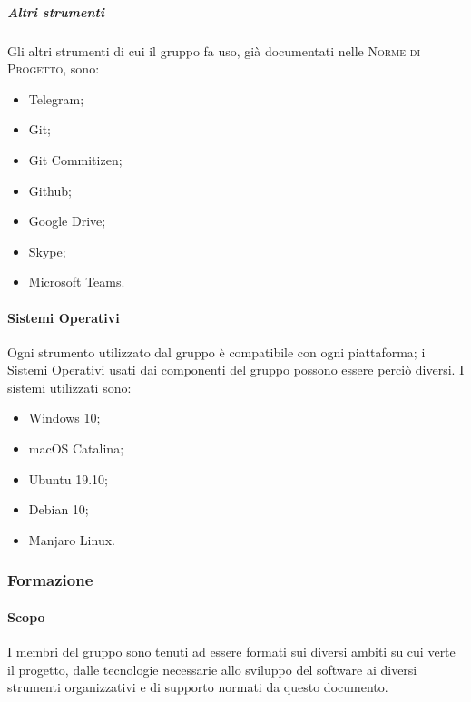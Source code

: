 \documentclass[../norme-di-progetto.tex]{subfiles}
\begin{document}
\subparagraph{Altri strumenti}
Gli altri strumenti di cui il gruppo fa uso, già documentati nelle \textsc{Norme di Progetto}, sono:
\begin{itemize}
  \item Telegram;
  \item Git;
  \item Git Commitizen;
  \item Github;
  \item Google Drive;
  \item Skype;
  \item Microsoft Teams.
\end{itemize}

\paragraph{Sistemi Operativi}
Ogni strumento utilizzato dal gruppo è compatibile con ogni piattaforma; i Sistemi Operativi usati dai componenti del gruppo possono essere perciò diversi. I sistemi utilizzati sono:
\begin{itemize}
  \item Windows 10;
  \item macOS Catalina;
  \item Ubuntu 19.10;
  \item Debian 10;
  \item Manjaro Linux.
\end{itemize}

\subsubsection{Formazione}
\paragraph{Scopo}
I membri del gruppo sono tenuti ad essere formati sui diversi ambiti su cui verte il progetto, dalle tecnologie necessarie allo sviluppo del software ai diversi strumenti organizzativi e di supporto normati da questo documento. \\
\end{document}
